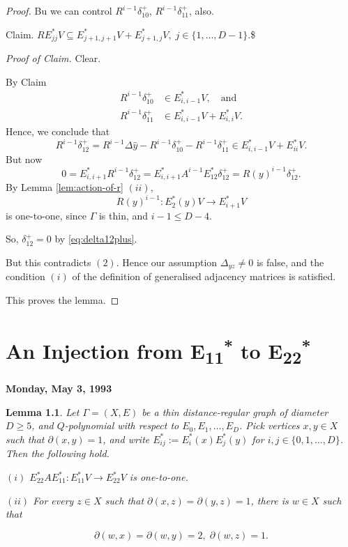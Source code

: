\documentclass[
]{book}
\newtheorem{lemma}{Lemma}[chapter]
\theoremstyle{definition}
\theoremstyle{definition}
\theoremstyle{definition}
\theoremstyle{definition}
\theoremstyle{remark}
\begin{document}
\begin{proof}
Bu we can control \(R^{i-1}\delta^+_{10}\), \(R^{i-1}\delta^+_{11}\), also.

Claim. \(RE^*_{jj}V \subseteq E^*_{j+1,j+1}V + E^*_{j+1, j}V, \; j\in \{1, \ldots, D-1\}.\)\$

\emph{Proof of Claim.} Clear.

By Claim
\begin{align}
R^{i-1}\delta^+_{10} &\in E^*_{i,i-1}V, \quad \text{and}\\
R^{i-1}\delta^+_{11} & \in E^*_{i,i-1}V + E^*_{i,i}V.
\end{align}
Hence, we conclude that
\[R^{i-1}\delta^+_{12} = R^{i-1}\Delta \hat{y} - R^{i-1}\delta^+_{10} - R^{i-1}\delta^+_{11}\in E^*_{i,i-1}V + E^*_{ii}V.\]
But now
\begin{equation}
0 = E^*_{i,i+1}R^{i-1}\delta^+_{12} = E^*_{i,i+1}A^{i-1}E^*_{12}\delta^+_{12} = R(y)^{i-1}\delta^+_{12}. \label{eq:delta12plus}
\end{equation}
By Lemma \ref{lem:action-of-r} \((ii)\),
\[R(y)^{i-1}: E^*_2(y)V \longrightarrow E^*_{i+1}V\]
is one-to-one, since \(\Gamma\) is thin, and \(i-1\leq D-4\).

So, \(\delta^+_{12}=0\) by \eqref{eq:delta12plus}.

But this contradicts \((2)\). Hence our assumption \(\Delta_{yz}\neq 0\) is false, and the condition \((i)\) of the definition of generalised adjacency matrices is satisfied.

This proves the lemma.
\end{proof}

\hypertarget{lec38}{%
\chapter{\texorpdfstring{An Injection from E\textsubscript{11}\textsuperscript{*} to E\textsubscript{22}\textsuperscript{*}}{An Injection from E11* to E22*}}\label{lec38}}

\textbf{Monday, May 3, 1993}

\begin{lemma}
\protect\hypertarget{lem:e11star-to-e22star}{}\label{lem:e11star-to-e22star}Let \(\Gamma = (X, E)\) be a thin distance-regular graph of diameter \(D\geq 5\), and \(Q\)-polynomial with respect to \(E_0, E_1, \ldots, E_D\).
Pick vertices \(x,y\in X\) such that \(\partial(x,y) = 1\), and write \(E^*_{ij}:=E^*_i(x)E^*_j(y)\) for \(i,j\in \{0, 1, \ldots, D\}\). Then the following hold.

\((i)\) \(E^*_{22}AE^*_{11}: E^*_{11}V \to E^*_{22}V\) is one-to-one.

\((ii)\) For every \(z\in X\) such that \(\partial(x,z) = \partial(y,z) = 1\), there is \(w\in X\) such that

\[\partial(w,x) = \partial(w,y) = 2, \; \partial(w,z)=1.\]
\end{lemma}
\end{document}
